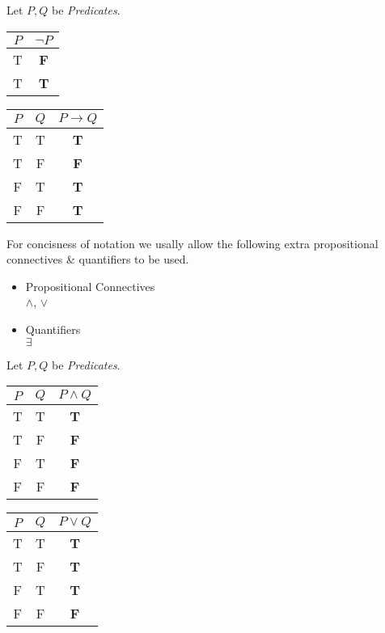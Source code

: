 \documentclass[11pt,a4paper]{article}
\begin{document}

Let $P,Q$ be \textit{Predicates}.
\begin{center}
\begin{tabular}{c|c}
$P$&$\neg P$\\
\hline T&\textbf{F}\\
T&\textbf{T}
\end{tabular}
\quad
\begin{tabular}{c|c|c}
$P$&$Q$&$P\to Q$\\
\hline T&T&\textbf{T}\\
T&F&\textbf{F}\\
F&T&\textbf{T}\\
F&F&\textbf{T}
\end{tabular}
\end{center}

For concisness of notation we usally allow the following extra propositional connectives \& quantifiers to be used.
\begin{itemize}
	\item Propositional Connectives\\
	$\wedge$, $\vee$
	\item Quantifiers\\
	$\exists$
\end{itemize}

Let $P,Q$ be \textit{Predicates}.
\begin{center}
\begin{tabular}{c|c|c}
$P$&$Q$&$P\wedge Q$\\
\hline T&T&\textbf{T}\\
T&F&\textbf{F}\\
F&T&\textbf{F}\\
F&F&\textbf{F}
\end{tabular}
\quad
\begin{tabular}{c|c|c}
$P$&$Q$&$P\vee Q$\\
\hline T&T&\textbf{T}\\
T&F&\textbf{T}\\
F&T&\textbf{T}\\
F&F&\textbf{F}
\end{tabular}
\end{center}

\end{document}
